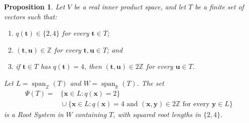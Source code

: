\documentclass[11pt]{amsart}
\newcommand\ints{{\mathbb Z}}
\newcommand\re{{\mathbb R}}%
\newcommand\Zu{{\mathbf u}}
\newcommand\Zy{{\mathbf y}}
\newcommand\Zx{{\mathbf x}}
\newcommand\opk[1]{\mathop{\mathrm{#1}}\nolimits}
\newtheorem{proposition}[theorem]{Proposition}
\theoremstyle{definition}
\newcommand{\Zt}{{\mathbf t}}
\begin{document}
\begin{proposition}\label{prop:psi}
Let $V$ be a real inner product space, and let $T$ be a finite set of
vectors such that:
\begin{enumerate}
\item $q(\Zt)\in\{2,4\}$ for every $\Zt\in T$;
\item $(\Zt,\Zu)\in\ints$ for every $\Zt,\Zu\in T$; and
\item if $\Zt\in T$ has $q(\Zt)=4$, then
      $(\Zt,\Zu)\in2\ints$ for every $\Zu\in T$.
\end{enumerate}
Let $L=\opk{span}_{\ints}(T)$ and $W=\opk{span}_{\re}(T)$.
The set
\begin{equation}\label{eq:psi}
\begin{split}
 \Psi(T)={}&\{\Zx\in L:q(\Zx)=2\}\\
 &{}\cup\{\Zx\in L:q(\Zx)=4\text{ and }
                 (\Zx,\Zy)\in2\ints\text{ for every }\Zy\in L\}
\end{split}
\end{equation}
is a Root System in $W$ containing $T$, with squared root lengths in
$\{2,4\}$.
\end{proposition}
\end{document}
